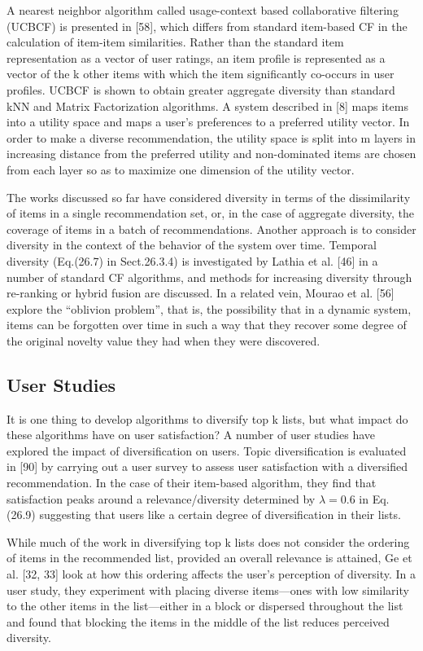 A nearest neighbor algorithm called usage-context based collaborative filtering (UCBCF) is presented in [58], which differs from standard item-based CF in the calculation of item-item similarities. Rather than the standard item representation as a vector of user ratings, an item profile is represented as a vector of the k other items with which the item significantly co-occurs in user profiles. UCBCF is shown to obtain greater aggregate diversity than standard kNN and Matrix Factorization algorithms. A system described in [8] maps items into a utility space and maps a user’s preferences to a preferred utility vector. In order to make a diverse recommendation, the utility space is split into m layers in increasing distance from the preferred utility and non-dominated items are chosen from each layer so as to maximize one dimension of the utility vector.

The works discussed so far have considered diversity in terms of the dissimilarity of items in a single recommendation set, or, in the case of aggregate diversity, the coverage of items in a batch of recommendations. Another approach is to consider diversity in the context of the behavior of the system over time. Temporal diversity (Eq.(26.7) in Sect.26.3.4) is investigated by Lathia et al. [46] in a number of standard CF algorithms, and methods for increasing diversity through re-ranking or hybrid fusion are discussed. In a related vein, Mourao et al. [56] explore the “oblivion problem”, that is, the possibility that in a dynamic system, items can be forgotten over time in such a way that they recover some degree of the original novelty value they had when they were discovered.

\subsection{User Studies}

It is one thing to develop algorithms to diversify top k lists, but what impact do these algorithms have on user satisfaction? A number of user studies have explored the impact of diversification on users. Topic diversification is evaluated in [90] by carrying out a user survey to assess user satisfaction with a diversified recommendation. In the case of their item-based algorithm, they find that satisfaction peaks around a relevance/diversity determined by $\lambda = 0.6$ in Eq. (26.9) suggesting that users like a certain degree of diversification in their lists.

While much of the work in diversifying top k lists does not consider the ordering of items in the recommended list, provided an overall relevance is attained, Ge et al. [32, 33] look at how this ordering affects the user’s perception of diversity. In a user study, they experiment with placing diverse items—ones with low similarity to the other items in the list—either in a block or dispersed throughout the list and found that blocking the items in the middle of the list reduces perceived diversity.

